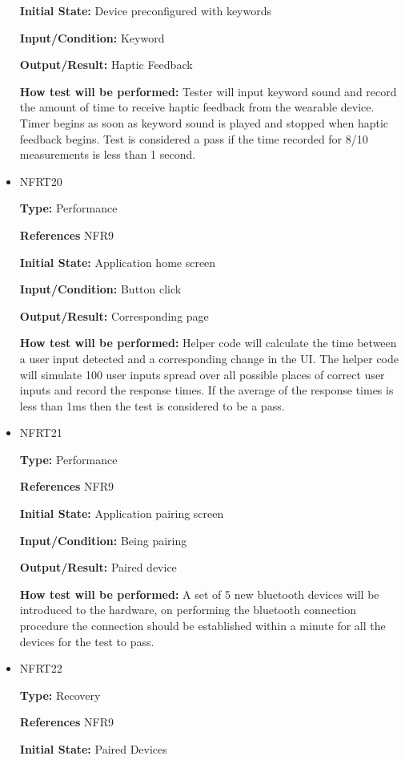 \documentclass[12pt, titlepage]{article}
\begin{document}
\begin{itemize}
\textbf{Initial State:} Device preconfigured with keywords
					
\textbf{Input/Condition:} Keyword
					
\textbf{Output/Result:} Haptic Feedback
					
\textbf{How test will be performed:} Tester will input keyword sound and record the amount of time to receive haptic feedback from the wearable device. Timer begins as soon as keyword sound is played and stopped when haptic feedback begins. Test is considered a pass if the time recorded for 8/10 measurements is less than 1 second.

\item{NFRT20}

\textbf{Type:} Performance

\textbf{References} NFR9
					
\textbf{Initial State:} Application home screen 
					
\textbf{Input/Condition:} Button click 
					
\textbf{Output/Result:} Corresponding page
					
\textbf{How test will be performed:} Helper code will calculate the time between a user input detected and a corresponding change in the UI. The helper code will simulate 100 user inputs spread over all possible places of correct user inputs and record the response times. If the average of the response times is less than 1ms then the test is considered to be a pass.

\item{NFRT21}

\textbf{Type:} Performance

\textbf{References} NFR9
					
\textbf{Initial State:} Application pairing screen
					
\textbf{Input/Condition:} Being pairing
					
\textbf{Output/Result:} Paired device 
					
\textbf{How test will be performed:} A set of 5 new bluetooth devices will be introduced to the hardware, on performing the bluetooth connection procedure the connection should be established within a minute for all the devices for the test to pass.

\item{NFRT22}

\textbf{Type:} Recovery

\textbf{References} NFR9
					
\textbf{Initial State:} Paired Devices
					

\end{itemize}
\end{document}
